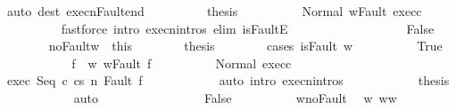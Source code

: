 \begin{isabellebody}
\ {\isacharparenleft}auto\ dest{\isacharcolon}\ execn{\isacharunderscore}Fault{\isacharunderscore}end{\isacharparenright}\isanewline
\ \ \ \ \ \ \isamarkupfalse%
\ \isamarkupfalse%
\ {\isacharquery}thesis\isanewline
\ \ \ \ \ \ \ \ \isamarkupfalse%
\ Normal\ w{\isacharunderscore}Fault\ exec{\isacharunderscore}c{}{\isacharprime}\isanewline
\ \ \ \ \ \ \ \ \isamarkupfalse%
\ {\isacharparenleft}fastforce\ intro{\isacharcolon}\ execn{\isachardot}intros\ elim{\isacharcolon}\ isFaultE{\isacharparenright}\ \ \ \ \ \ \isanewline
\ \ \ \ \isamarkupfalse%
\isanewline
\ \ \ \ \ \ \isamarkupfalse%
\ False\isanewline
\ \ \ \ \ \ \isamarkupfalse%
\ noFault{\isacharunderscore}w\ {\isacharequal}\ this\isanewline
\ \ \ \ \ \ \isamarkupfalse%
\ {\isacharquery}thesis\isanewline
\ \ \ \ \ \ \isamarkupfalse%
\ {\isacharparenleft}cases\ {\isachardoublequoteopen}isFault\ w{\isacharprime}{\isachardoublequoteclose}{\isacharparenright}\isanewline
\ \ \ \ \ \ \ \ \isamarkupfalse%
\ True\isanewline
\ \ \ \ \ \ \ \ \isamarkupfalse%
\ \isamarkupfalse%
\ f{\isacharprime}\ \ w{\isacharprime}{\isacharcolon}\ {\isachardoublequoteopen}w{\isacharprime}{\isacharequal}Fault\ f{\isacharprime}{\isachardoublequoteclose}\isacommand{{\isachardot}{\isachardot}}\isamarkupfalse%
\isanewline
\ \ \ \ \ \ \ \ \isamarkupfalse%
\ Normal\ exec{\isacharunderscore}c{}{\isacharprime}\ \isanewline
\ \ \ \ \ \ \ \ \isamarkupfalse%
\ exec{\isacharcolon}\ {\isachardoublequoteopen}{\isasymGamma}{\isasymturnstile}{\isasymlangle}Seq\ c{}{\isacharprime}\ c{}{\isacharprime}{\isacharcomma}s{\isasymrangle}\ {\isacharequal}n{\isasymRightarrow}\ Fault\ f{\isacharprime}{\isachardoublequoteclose}\isanewline
\ \ \ \ \ \ \ \ \ \ \isamarkupfalse%
\ {\isacharparenleft}auto\ intro{\isacharcolon}\ execn{\isachardot}intros{\isacharparenright}\isanewline
\ \ \ \ \ \ \ \ \isamarkupfalse%
\ \isamarkupfalse%
\ {\isacharquery}thesis\isanewline
\ \ \ \ \ \ \ \ \ \ \isamarkupfalse%
\ auto\isanewline
\ \ \ \ \ \ \isamarkupfalse%
\isanewline
\ \ \ \ \ \ \ \ \isamarkupfalse%
\ False\isanewline
\ \ \ \ \ \ \ \ \isamarkupfalse%
\ w{\isacharprime}{\isacharunderscore}noFault\ \isamarkupfalse%
\ w{\isacharprime}{\isacharcolon}\ {\isachardoublequoteopen}w{\isacharprime}{\isacharequal}w{\isachardoublequoteclose}\ \isamarkupfalse%

\end{isabellebody}
